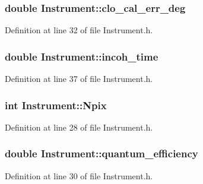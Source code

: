 \hypertarget{classInstrument_a755a26a3b1c7ea48fdcf213371254068}{
\subsubsection[{clo\_\-cal\_\-err\_\-deg}]{\setlength{\rightskip}{0pt plus 5cm}double {\bf Instrument::clo\_\-cal\_\-err\_\-deg}}}
\label{classInstrument_a755a26a3b1c7ea48fdcf213371254068}


Definition at line 32 of file Instrument.h.

\hypertarget{classInstrument_ab431265cc3192bfcc9ceeafd1d30605b}{
\subsubsection[{incoh\_\-time}]{\setlength{\rightskip}{0pt plus 5cm}double {\bf Instrument::incoh\_\-time}}}
\label{classInstrument_ab431265cc3192bfcc9ceeafd1d30605b}


Definition at line 37 of file Instrument.h.

\hypertarget{classInstrument_a349e2122c222f16ed712b5fb8660adb4}{
\subsubsection[{Npix}]{\setlength{\rightskip}{0pt plus 5cm}int {\bf Instrument::Npix}}}
\label{classInstrument_a349e2122c222f16ed712b5fb8660adb4}


Definition at line 28 of file Instrument.h.

\hypertarget{classInstrument_af352575aa1a6bb255db663a53fbb2b8b}{
\subsubsection[{quantum\_\-efficiency}]{\setlength{\rightskip}{0pt plus 5cm}double {\bf Instrument::quantum\_\-efficiency}}}
\label{classInstrument_af352575aa1a6bb255db663a53fbb2b8b}


Definition at line 30 of file Instrument.h.


